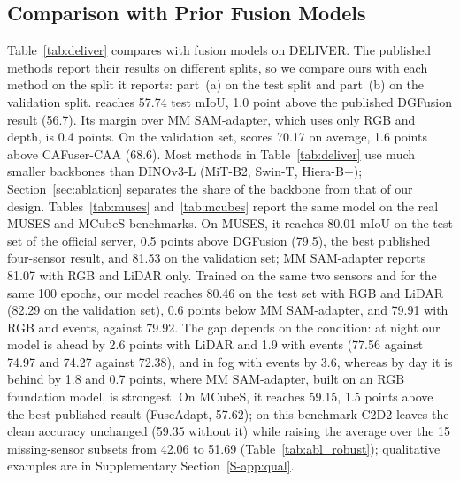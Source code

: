 \subsection{Comparison with Prior Fusion Models}
Table~\ref{tab:deliver} compares \ours{} with fusion models on DELIVER. The published methods report their results on different splits, so we compare ours with each method on the split it reports: part~(a) on the test split and part~(b) on the validation split. \ours{} reaches 57.74 test mIoU, 1.0 point above the published DGFusion result (56.7). Its margin over MM SAM-adapter, which uses only RGB and depth, is 0.4 points. On the validation set, \ours{} scores 70.17 on average, 1.6 points above CAFuser-CAA (68.6). Most methods in Table~\ref{tab:deliver} use much smaller backbones than DINOv3-L (MiT-B2, Swin-T, Hiera-B+); Section~\ref{sec:ablation} separates the share of the backbone from that of our design. Tables~\ref{tab:muses} and~\ref{tab:mcubes} report the same model on the real MUSES and MCubeS benchmarks. On MUSES, it reaches 80.01 mIoU on the test set of the official server, 0.5 points above DGFusion (79.5), the best published four-sensor result, and 81.53 on the validation set; MM SAM-adapter reports 81.07 with RGB and LiDAR only. Trained on the same two sensors and for the same 100 epochs, our model reaches 80.46 on the test set with RGB and LiDAR (82.29 on the validation set), 0.6 points below MM SAM-adapter, and 79.91 with RGB and events, against 79.92. The gap depends on the condition: at night our model is ahead by 2.6 points with LiDAR and 1.9 with events (77.56 against 74.97 and 74.27 against 72.38), and in fog with events by 3.6, whereas by day it is behind by 1.8 and 0.7 points, where MM SAM-adapter, built on an RGB foundation model, is strongest. On MCubeS, it reaches 59.15, 1.5 points above the best published result (FuseAdapt, 57.62); on this benchmark C2D2 leaves the clean accuracy unchanged (59.35 without it) while raising the average over the 15 missing-sensor subsets from 42.06 to 51.69 (Table~\ref{tab:abl_robust}); qualitative examples are in Supplementary Section~\ref{S-app:qual}.


